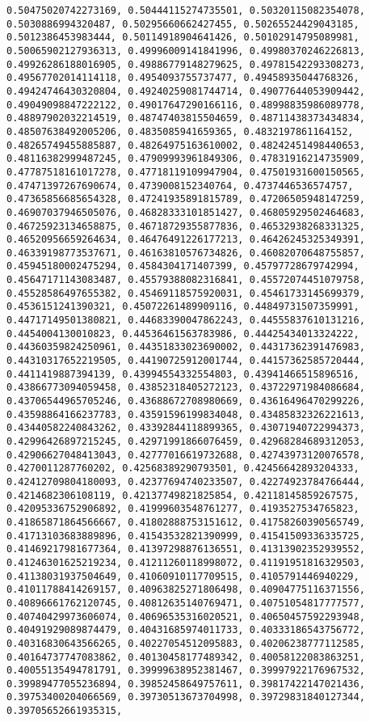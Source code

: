 \documentclass[11pt]{article}
\begin{document}
\begin{Verbatim}[commandchars=\\\{\}]
0.50475020742273169, 0.50444115274735501, 0.50320115082354078, 0.5030886994320487, 0.50295660662427455, 0.50265524429043185, 0.5012386453983444, 0.50114918904641426, 0.50102914795089981, 0.50065902127936313, 0.49996009141841996, 0.49980370246226813, 0.49926286188016905, 0.49886779148279625, 0.49781542293308273, 0.49567702014114118, 0.4954093755737477, 0.49458935044768326, 0.49424746430320804, 0.49240259081744714, 0.49077644053909442, 0.49049098847222122, 0.49017647290166116, 0.48998835986089778, 0.48897902032214519, 0.48747403815504659, 0.48711438373434834, 0.48507638492005206, 0.4835085941659365, 0.4832197861164152, 0.48265749455885887, 0.48264975163610002, 0.48242451498440653, 0.48116382999487245, 0.47909993961849306, 0.47831916214735909, 0.47787518161017278, 0.47718119109947904, 0.47501931600150565, 0.47471397267690674, 0.4739008152340764, 0.4737446536574757, 0.47365856685654328, 0.47241935891815789, 0.47206505948147259, 0.46907037946505076, 0.46828333101851427, 0.46805929502464683, 0.46725923134658875, 0.46718729355877836, 0.46532938268331325, 0.46520956659264634, 0.46476491226177213, 0.46426245325349391, 0.46339198773537671, 0.46163810576734826, 0.46082070648755857, 0.45945180002475294, 0.4584304171407399, 0.45797728679742994, 0.45647171143083487, 0.45579388082316841, 0.45572074451079758, 0.45528586497655382, 0.45469118575920031, 0.45461733145699379, 0.4536151241390321, 0.45072261489909116, 0.44849731507359991, 0.44717149501380821, 0.44683390047862243, 0.44555837610131216, 0.4454004130010823, 0.44536461563783986, 0.44425434013324222, 0.44360359824250961, 0.44351833023690002, 0.44317362391476983, 0.44310317652219505, 0.44190725912001744, 0.44157362585720444, 0.4411419887394139, 0.43994554332554803, 0.43941466515896516, 0.43866773094059458, 0.43852318405272123, 0.43722971984086684, 0.43706544965705246, 0.43688672708980669, 0.43616496470299226, 0.43598864166237783, 0.43591596199834048, 0.43485832326221613, 0.43440582240843262, 0.43392844118899365, 0.43071940722994373, 0.42996426897215245, 0.42971991866076459, 0.42968284689312053, 0.42906627048413043, 0.42777016619732688, 0.42743973120076578, 0.4270011287760202, 0.42568389290793501, 0.42456642893204333, 0.42412709804180093, 0.42377694740233507, 0.42274923784766444, 0.4214682306108119, 0.42137749821825854, 0.42118145859267575, 0.42095336752906892, 0.41999603548761277, 0.4193527534765823, 0.41865871864566667, 0.41802888753151612, 0.41758260390565749, 0.41713103683889896, 0.41543532821390999, 0.41541509336335725, 0.41469217981677364, 0.41397298876136551, 0.41313902352939552, 0.41246301625219234, 0.41211260118998072, 0.41191951816329503, 0.41138031937504649, 0.41060910117709515, 0.4105791446940229, 0.41011788414269157, 0.40963825271806498, 0.40904775116371556, 0.40896661762120745, 0.40812635140769471, 0.40751054817777577, 0.40740429973606074, 0.40696535316020521, 0.40650457592293948, 0.40491929089874479, 0.40431685974011733, 0.40333186543756772, 0.40316830643566265, 0.40227054512095883, 0.40206238777112585, 0.40164737747083862, 0.40130458177489342, 0.40058122083863251, 0.40055135494781791, 0.39999638952381467, 0.39997922176967532, 0.39989477055236894, 0.39852458649757611, 0.39817422147021436, 0.39753400204066569, 0.39730513673704998, 0.39729831840127344, 0.39705652661935315, 
\end{Verbatim}
\end{document}
